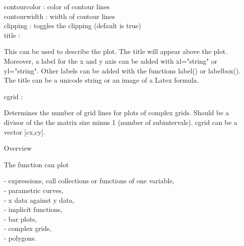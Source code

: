 \documentclass{article}
\newenvironment{eulernotebook}{\par}{\par}
\newenvironment{eulercomment}{\par\medskip}{\par\medskip}
\begin{document}
\begin{eulernotebook}
\begin{eulercomment}
\begin{eulercomment}
\begin{eulercomment}
\begin{eulercomment}
\begin{eulercomment}
contourcolor : color of contour lines\\
contourwidth : width of contour lines\\
clipping  : toggles the clipping (default is true)\\
title     :\\
\end{eulercomment}
\begin{eulerttcomment}
  This can be used to describe the plot. The title will appear above
  the plot. Moreover, a label for the x and y axis can be added with
  xl="string" or yl="string". Other labels can be added with the
  functions label() or labelbox(). The title can be a unicode
  string or an image of a Latex formula.
\end{eulerttcomment}
\begin{eulercomment}
cgrid     :\\
\end{eulercomment}
\begin{eulerttcomment}
  Determines the number of grid lines for plots of complex grids.
  Should be a divisor of the the matrix size minus 1 (number of
  subintervals). cgrid can be a vector [cx,cy].
\end{eulerttcomment}
\begin{eulercomment}

Overview

The function can plot

- expressions, call collections or functions of one variable,\\
- parametric curves,\\
- x data against y data,\\
- implicit functions,\\
- bar plots,\\
- complex grids,\\
- polygons.


\end{eulercomment}
\end{eulercomment}
\end{eulercomment}
\end{eulercomment}
\end{eulercomment}
\end{eulernotebook}
\end{document}
